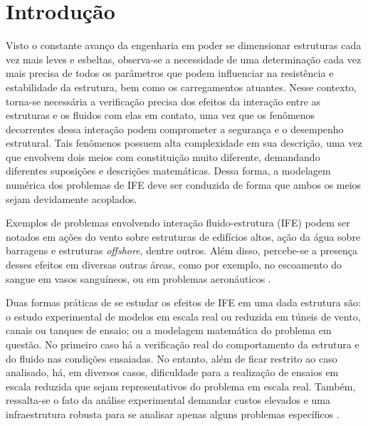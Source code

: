 \chapter{Introdução}


Visto o constante avanço da engenharia em poder se dimensionar estruturas cada vez mais leves e esbeltas, observa-se a necessidade de uma determinação cada vez mais precisa de todos os parâmetros que podem influenciar na resistência e estabilidade da estrutura, bem como os carregamentos atuantes. Nesse contexto, torna-se necessária a verificação precisa dos efeitos da interação entre as estruturas e os fluidos com elas em contato, uma vez que os fenômenos decorrentes dessa interação podem comprometer a segurança e o desempenho estrutural. Tais fenômenos possuem alta complexidade em sua descrição, uma vez que envolvem dois meios com constituição muito diferente, demandando diferentes suposições e descrições matemáticas. Dessa forma, a modelagem numérica dos problemas de IFE deve ser conduzida de forma que ambos os meios sejam devidamente acoplados.

Exemplos de problemas envolvendo interação fluido-estrutura (IFE) podem ser notados em ações do vento sobre estruturas de edifícios altos, ação da água sobre barragens e estruturas \textit{offshore}, dentre outros. Além disso, percebe-se a presença desses efeitos em diversas outras áreas, como por exemplo, no escoamento do sangue em vasos sanguíneos, ou em problemas aeronáuticos \cite{sanches2014fluid, fernandes2020tecnica}.

Duas formas práticas de se estudar os efeitos de IFE em uma dada estrutura são: o estudo experimental de modelos em escala real ou reduzida em túneis de vento, canais ou tanques de ensaio; ou a modelagem matemática do problema em questão. No primeiro caso há a verificação real do comportamento da estrutura e do fluido nas condições ensaiadas. No entanto, além de ficar restrito ao caso analisado, há, em diversos casos, dificuldade para a realização de ensaios em escala reduzida que sejam representativos do problema em escala real. Também, ressalta-se o fato da análise experimental demandar custos elevados e uma infraestrutura robusta para se analisar apenas alguns problemas específicos \cite{fernandes2020tecnica}.

